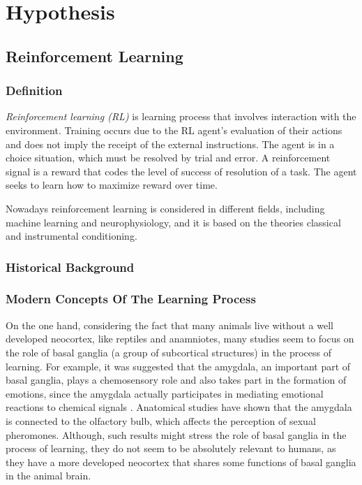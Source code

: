 \documentclass[14pt,a4paper]{scrartcl}
\begin{document}
\section{Hypothesis}
\label{sec:Hypothesis}

\subsection{Reinforcement Learning}
\label{sec:Hypothesis:Reinforcement Learning}

\subsubsection{Definition}
\label{sec:Hypothesis:Learning Process:Definition}

\textit{Reinforcement learning (RL)} is learning process that involves interaction with the environment. Training occurs due to the RL agent's evaluation of their actions and does not imply the receipt of the external instructions. The agent is in a choice situation, which must be resolved by trial and error. A reinforcement signal is a reward that codes the level of success of resolution of a task. The agent seeks to learn how to maximize reward over time. 

Nowadays reinforcement learning is considered in different fields, including machine learning and neurophysiology, and it is based on the theories classical and instrumental conditioning.

\subsubsection{Historical Background}
\label{sec:Hypothesis:Learning Process:Historical Background}

\subsubsection{Modern Concepts Of The Learning Process}
\label{sec:Hypothesis:Learning Process:Modern Concepts Of The Learning Process}

On the one hand, considering the fact that many animals live without a well developed neocortex, like reptiles and anamniotes, many studies seem to focus on the role of basal ganglia (a group of subcortical structures) in the process of learning. For example, it was suggested that the amygdala, an important part of basal ganglia, plays a chemosensory role and also takes part in the formation of emotions, since the amygdala actually participates in mediating emotional reactions to chemical signals \cite{Martinez-Garcia2010}. Anatomical studies have shown that the amygdala is connected to the olfactory bulb, which affects the perception of sexual pheromones. Although, such results might stress the role of basal ganglia in the process of learning, they do not seem to be absolutely relevant to humans, as they have a more developed neocortex that shares some functions of basal ganglia in the animal brain.
\end{document}
